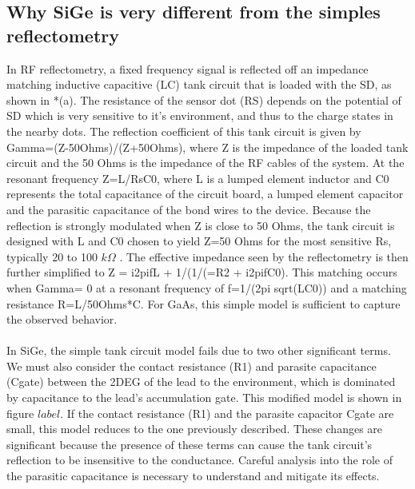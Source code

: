 \documentclass{article}
\begin{document}
\subsection{Why SiGe is very different from the simples reflectometry} %
	\label{sub:why_sige_is_very_different_from_the_simples_reflectometry}
	In RF reflectometry, a fixed frequency signal is reflected off an impedance matching inductive capacitive (LC) tank circuit that is loaded with the SD, as shown in *(a).  The resistance of the sensor dot (RS) depends on the potential of SD which is very sensitive to it’s environment, and thus to the charge states in the nearby dots.   The reflection coefficient of this tank circuit is given by Gamma=(Z-50Ohms)/(Z+50Ohms), where Z is the impedance of the loaded tank circuit and the 50 Ohms is the impedance of the RF cables of the system.  At the resonant frequency Z=L/RsC0, where L is a lumped element inductor and C0 represents the total capacitance of the circuit board, a lumped element capacitor and the parasitic capacitance of the bond wires to the device.  Because the reflection is strongly modulated when Z is close to 50 Ohms, the tank circuit is designed with L and C0 chosen to yield Z=50 Ohms for the most sensitive Rs, typically 20 to 100 $k\Omega$
	.  The effective impedance seen by the reflectometry is then further simplified to Z = i2pifL + 1/(1/(=R2 + i2pifC0).   This matching occurs when Gamma= 0 at a resonant frequency of f=1/(2pi sqrt(LC0)) and a matching resistance R=L/50Ohms*C.  For GaAs, this simple model is sufficient to capture the observed behavior. 
	\\ \\
	In SiGe, the simple tank circuit model fails due to two other significant terms.  We must also consider the contact resistance (R1) and parasite capacitance (Cgate) between the 2DEG of the lead to the environment, which is dominated by capacitance to the lead’s accumulation gate.  This modified model is shown in figure $label$.  If the contact resistance (R1) and the parasite capacitor Cgate are small, this model reduces to the one previously described.  These changes are significant because the presence of these terms can cause the tank circuit’s reflection to be insensitive to the conductance. Careful analysis into the role of the parasitic capacitance is necessary to understand and mitigate its effects.  
	\\ \\
\end{document}
